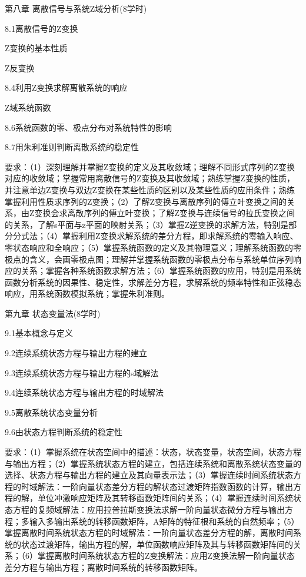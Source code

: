 \documentclass[letterpaper]{article}
\begin{document}
第八章 \quad 离散信号与系统Z域分析(8学时)\par
\quad\quad 8.1离散信号的Z变换\par
\quad{} Z变换的基本性质\par
\quad{} Z反变换\par
\quad\quad 8.4利用Z变换求解离散系统的响应\par
\quad{} Z域系统函数\par
\quad\quad 8.6系统函数的零、极点分布对系统特性的影响\par
\quad\quad 8.7用朱利准则判断离散系统的稳定性\par
\quad\quad 要求：（1）深刻理解并掌握Z变换的定义及其收敛域；理解不同形式序列的Z变换对应的收敛域；掌握常用离散信号的Z变换及其收敛域；熟练掌握Z变换的性质，并注意单边Z变换与双边Z变换在某些性质的区别以及某些性质的应用条件；熟练掌握利用性质求序列的Z变换；（2）了解Z变换与离散序列的傅立叶变换之间的关系，由Z变换会求离散序列的傅立叶变换；了解Z变换与连续信号的拉氏变换之间的关系，了解s平面与z平面的映射关系；（3）掌握Z逆变换的求解方法，特别是部分分式法；（4）掌握利用Z变换求解系统的差分方程，即求解系统的零输入响应、零状态响应和全响应；（5）掌握系统函数的定义及其物理意义；理解系统函数的零极点的含义，会画零极点图；理解并掌握系统函数的零极点分布与系统单位序列响应的关系；掌握各种系统函数求解方法；（6）掌握系统函数的应用，特别是用系统函数分析系统的因果性、稳定性，求解差分方程，求解系统的频率特性和正弦稳态响应，用系统函数模拟系统；掌握朱利准则。\par
\vspace{1em}
第九章 \quad 状态变量法(8学时)\par
\quad\quad 9.1基本概念与定义\par
\quad\quad 9.2连续系统状态方程与输出方程的建立\par
\quad\quad 9.3连续系统状态方程与输出方程的s域解法\par
\quad\quad 9.4连续系统状态方程与输出方程的时域解法\par
\quad\quad 9.5离散系统状态变量分析\par
\quad\quad 9.6由状态方程判断系统的稳定性\par
\quad\quad 要求：（1）掌握系统在状态空间中的描述：状态，状态变量，状态空间，状态方程与输出方程；（2）掌握系统状态方程的建立，包括连续系统和离散系统状态变量的选择、状态方程与输出方程的建立及其向量表示法；（3）掌握连续时间系统状态方程的时域解法：一阶向量状态差分方程的解状态过渡矩阵指数函数的计算，输出方程的解，单位冲激响应矩阵及其转移函数矩阵间的关系；（4）掌握连续时间系统状态方程的复频域解法：应用拉普拉斯变换法求解一阶向量状态微分方程与输出方程；多输入多输出系统的转移函数矩阵，A矩阵的特征根和系统的自然频率；（5）掌握离散时间系统状态方程的时域解法：一阶向量状态差分方程的解，离散时间系统的状态过渡矩阵，输出方程的解，单位函数响应矩阵及其与转移函数矩阵间的关系；（6）掌握离散时间系统状态方程的Z变换解法：应用Z变换法解一阶向量状态差分方程与输出方程；离散时间系统的转移函数矩阵。\par
\vspace{1em}
\end{document}
